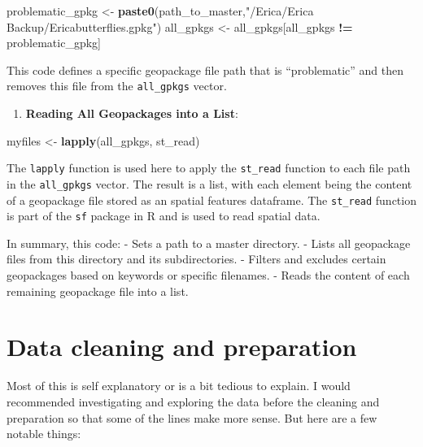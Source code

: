 \documentclass[
]{book}
\newenvironment{Shaded}{\begin{snugshade}}{\end{snugshade}}
\newcommand{\FunctionTok}[1]{\textcolor[rgb]{0.13,0.29,0.53}{\textbf{#1}}}
\newcommand{\NormalTok}[1]{#1}
\newcommand{\OtherTok}[1]{\textcolor[rgb]{0.56,0.35,0.01}{#1}}
\newcommand{\SpecialCharTok}[1]{\textcolor[rgb]{0.81,0.36,0.00}{\textbf{#1}}}
\newcommand{\StringTok}[1]{\textcolor[rgb]{0.31,0.60,0.02}{#1}}
\providecommand{\tightlist}{%
  \setlength{\itemsep}{0pt}\setlength{\parskip}{0pt}}
\theoremstyle{definition}
\theoremstyle{definition}
\theoremstyle{definition}
\theoremstyle{definition}
\theoremstyle{remark}
\begin{document}
\begin{Shaded}
\begin{Highlighting}[]
\NormalTok{   problematic\_gpkg }\OtherTok{\textless{}{-}} \FunctionTok{paste0}\NormalTok{(path\_to\_master,}\StringTok{"/Erica/Erica Backup/Ericabutterflies.gpkg"}\NormalTok{)}
\NormalTok{   all\_gpkgs }\OtherTok{\textless{}{-}}\NormalTok{ all\_gpkgs[all\_gpkgs }\SpecialCharTok{!=}\NormalTok{ problematic\_gpkg]}
\end{Highlighting}
\end{Shaded}

This code defines a specific geopackage file path that is ``problematic'' and then removes this file from the \texttt{all\_gpkgs} vector.

\begin{enumerate}
\def\labelenumi{\arabic{enumi}.}
\setcounter{enumi}{5}
\tightlist
\item
  \textbf{Reading All Geopackages into a List}:
\end{enumerate}

\begin{Shaded}
\begin{Highlighting}[]
\NormalTok{myfiles }\OtherTok{\textless{}{-}} \FunctionTok{lapply}\NormalTok{(all\_gpkgs, st\_read)}
\end{Highlighting}
\end{Shaded}

The \texttt{lapply} function is used here to apply the \texttt{st\_read} function to each file path in the \texttt{all\_gpkgs} vector. The result is a list, with each element being the content of a geopackage file stored as an spatial features dataframe. The \texttt{st\_read} function is part of the \texttt{sf} package in R and is used to read spatial data.

In summary, this code:
- Sets a path to a master directory.
- Lists all geopackage files from this directory and its subdirectories.
- Filters and excludes certain geopackages based on keywords or specific filenames.
- Reads the content of each remaining geopackage file into a list.

\hypertarget{data-cleaning-and-preparation}{%
\section{Data cleaning and preparation}\label{data-cleaning-and-preparation}}

Most of this is self explanatory or is a bit tedious to explain. I would recommended investigating and exploring the data before the cleaning and preparation so that some of the lines make more sense. But here are a few notable things:
\end{document}
